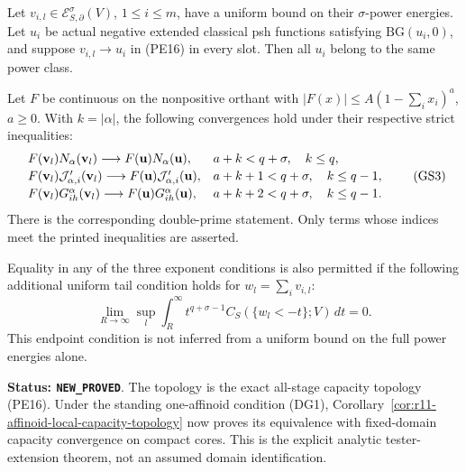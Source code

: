 \begin{theorem}
\label{thm:r11-nonmonotone-graded-stability}
Let $v_{i,l}\in\mathcal E^\sigma_{S,\partial}(V)$,
$1\leq i\leq m$, have a uniform bound on their
$\sigma$-power energies. Let $u_i$ be actual negative
extended classical psh functions satisfying
$\mathrm{BG}(u_i,0)$, and suppose
$v_{i,l}\to u_i$ in (PE16) in every slot.
Then all $u_i$ belong to the same power class.

Let $F$ be continuous on the nonpositive orthant with
$|F(x)|\leq A(1-\sum_i x_i)^a$, $a\geq0$.
With $k=|\alpha|$, the following convergences hold
under their respective strict inequalities:
\[
\begin{array}{ll}
 F(\mathbf v_l)N_\alpha(\mathbf v_l)
       \longrightarrow F(\mathbf u)N_\alpha(\mathbf u),
       &a+k<q+\sigma,\quad k\leq q,\\[2pt]
 F(\mathbf v_l){\cal J}'_{\alpha,i}(\mathbf v_l)
       \longrightarrow F(\mathbf u){\cal J}'_{\alpha,i}(\mathbf u),
       &a+k+1<q+\sigma,\quad k\leq q-1,\\[2pt]
 F(\mathbf v_l)G^\alpha_{ih}(\mathbf v_l)
       \longrightarrow F(\mathbf u)G^\alpha_{ih}(\mathbf u),
       &a+k+2<q+\sigma,\quad k\leq q-1.
\end{array}
 \tag{GS3}
\]
There is the corresponding double-prime statement.
Only terms whose indices meet the printed inequalities
are asserted.

Equality in any of the three exponent conditions is
also permitted if the following additional uniform
tail condition holds for $w_l=\sum_i v_{i,l}$:
\[
 \lim_{R\to\infty}\sup_l
       \int_R^\infty t^{q+\sigma-1}
              C_S(\{w_l<-t\};V)\,dt=0.
 \tag{GS4}
\]
This endpoint condition is not inferred from a
uniform bound on the full power energies alone.
\end{theorem}

\noindent\textbf{Status: \texttt{NEW\_PROVED}}.
The topology is the exact all-stage capacity topology
(PE16). Under the standing one-affinoid condition (DG1),
Corollary~\ref{cor:r11-affinoid-local-capacity-topology}
now proves its equivalence with fixed-domain capacity
convergence on compact cores. This is the explicit analytic
tester-extension theorem, not an assumed domain identification.

